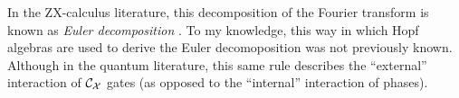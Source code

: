 \begin{theorem}
%
%
%
%
\end{theorem}
In the ZX-calculus literature, this decomposition of the Fourier transform is known as {\it Euler decomposition} \cite{duncan2009graph}.  To my knowledge, this way in which Hopf algebras are used to derive the Euler decomoposition was not previously known.  Although in the quantum literature, this same rule describes the ``external'' interaction of ${\cal C}_{\cal X}$ gates (as opposed to the ``internal'' interaction of phases).




